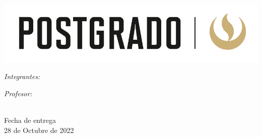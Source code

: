 \begin{titlepage}

\setlength{\parskip}{0pt}

\begin{center}
\includegraphics[width=1\textwidth]{Figures/upc_p}

    \vspace{0.6cm}
    {\zhawtitlefont\color{zhawblue}\LARGE \univname\par}   %
    \vspace{0.2cm}
{\Large  \deptname\par}                      %
\vspace{0.2cm}
\vspace{3.5cm}                            
\textsc{\Large \ttype}                                 %
\vspace{0.2cm}
\HRule 
\vspace{0.4cm}
{\huge \bfseries \ttitle\par}                          %
\vspace{0.4cm}  
\HRule
\vspace{1.5cm}

 
\begin{minipage}[t]{0.4\textwidth}
\begin{flushleft} 
    \large
    \emph{Integrantes:}\\
    \authorname
\end{flushleft}
\end{minipage}
\begin{minipage}[t]{0.4\textwidth}
\begin{flushright} 
    \large
    \emph{Profesor:} \\
    \supnameA \\
    \supnameB
\end{flushright}
\end{minipage}
\vspace{2cm}
 
\vfill

{\large
Fecha de entrega\\
28 de Octubre de 2022 \\
\vspace{1.5cm}
}
\vfill
\end{center}
\end{titlepage}
\restoregeometry


